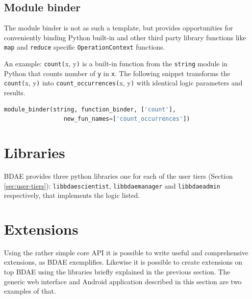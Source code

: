 \subsection{Module binder}
The module binder is not as such a template, but provides opportunities for conveniently binding Python built-in and other third party library functions like \texttt{map} and \texttt{reduce} specific \texttt{OperationContext} functions.
\newline

An example: \texttt{count(}x, y\texttt{)} is a built-in function from the \texttt{string} module in Python \cite{PagePython} that counts number of \texttt{y} in \texttt{x}. The following snippet transforms the \texttt{count(}x, y\texttt{)} into \texttt{count\_occurrences(}x, y\texttt{)} with identical logic parameters and results.
\vspace*{2mm}
\begin{lstlisting}[language=Python, basicstyle=\footnotesize, numbers=none, showtabs=false, showstringspaces=false, showspaces=false, otherkeywords={string,new_fun_names}, stringstyle=\color{blue}]
   module_binder(string, function_binder, ['count'], 
                 new_fun_names=['count_occurrences'])
\end{lstlisting}
\vspace*{-6mm}

\section{Libraries} \label{sec:libraries}
BDAE provides three python libraries one for each of the user tiers (Section \ref{sec:user-tiers}): \texttt{libbdaescientist}, \texttt{libbdaemanager} and \texttt{libbdaeadmin} respectively, that implements the logic listed.

\section{Extensions}
Using the rather simple \CodeName core API it is possible to write useful and comprehensive extensions, as BDAE exemplifies. Likewise it is possible to create extensions on top BDAE using the libraries briefly explained in the previous section. The generic web interface and Android\cite{PageAndroid} application described in this section are two examples of that.

